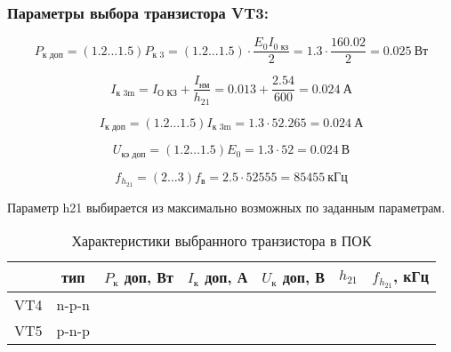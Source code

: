 \subsubsection{Параметры выбора транзистора VT3:}
\begin{equation}
\label{eq:equation3_6}
P_{\text{к доп}} = (1.2 \ldots 1.5) P_{\text{к 3}} = (1.2 \ldots 1.5) \cdot \dfrac{E_0 I_{\text{0 кз}}}{2} = 1.3 \cdot \dfrac{16 0.02}{2} = 0.025~\text{Вт}
\end{equation}

\begin{equation}
\label{eq:equation3_7}
I_{\text{к 3m}} = I_{\text{О КЗ}} + \dfrac{I_{\text{нм}}}{h_21} = 0.013 + \dfrac{2.54}{600} = 0.024~\text{А}
\end{equation}

\begin{equation}
\label{eq:equation3_8}
I_{\text{к доп}} = (1.2 \ldots 1.5) I_{\text{к 3m}} = 1.3 \cdot 52.265 = 0.024~\text{А}
\end{equation}

\begin{equation}
\label{eq:equation3_9}
U_{\text{кэ доп}} = (1.2 \ldots 1.5) E_{\text{0}} = 1.3 \cdot 52 = 0.024~\text{В}
\end{equation}

\begin{equation}
\label{eq:equation3_10}
f_{h_{21}} = (2 \ldots 3) f_{\text{в}} = 2.5 \cdot 52555 = 85455~\text{кГц}
\end{equation}

Параметр h21 выбирается из максимально возможных по заданным параметрам.

\begin{table}[htbp]
\caption{Характеристики выбранного транзистора в ПОК}
\begin{center}\begin{tabular}{|c|c|c|c|c|c|c|}
\hline 
  & тип & $P_{\text{к}}$ доп, Вт & $I_{\text{к}}$ доп, А & $U_{\text{к}}$ доп, В & $h_{21}$ &  $f_{h_{21}}$, кГц \\ 
\hline 
VT4 & n-p-n &   &  &  &  & \\ 
\hline 
VT5 & p-n-p &   &  &  &  &  \\ 
\hline 
\end{tabular} 
\end{center}
\end{table}


